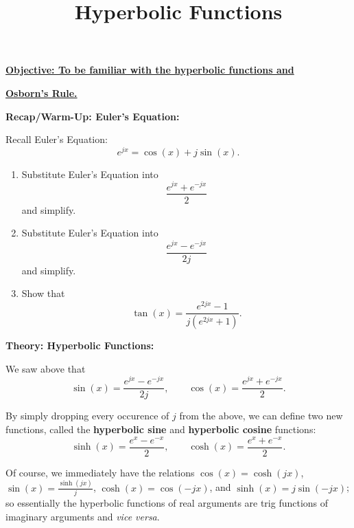 \documentclass{article}
\begin{document}
\title{Hyperbolic Functions}
\date{}

\maketitle
\thispagestyle{empty}

\Large

\textbf{\underline{Objective: To be familiar with the hyperbolic functions and}}

\textbf{\underline{Osborn's Rule.}}




\vspace{5mm}


\textbf{Recap/Warm-Up: Euler's Equation:}


\vspace{5mm}

Recall Euler's Equation:
\[e^{jx}=\cos(x)+j\sin(x).\]

\begin{enumerate}
	\item Substitute Euler's Equation into
		\[\frac{e^{jx}+e^{-jx}}{2}\]
		and simplify.
	\item Substitute Euler's Equation into
		\[\frac{e^{jx}-e^{-jx}}{2j}\]
		and simplify.
	\item Show that
		\[\tan(x)=\frac{e^{2jx}-1}{j(e^{2jx}+1)}.\]
\end{enumerate}







\clearpage



\textbf{Theory: Hyperbolic Functions:}

\vspace{5mm}

We saw above that
\[\sin(x)=\frac{e^{jx}-e^{-jx}}{2j},\qquad \cos(x)=\frac{e^{jx}+e^{-jx}}{2}.\]

By simply dropping every occurence of $j$ from the above, we can define two new functions, called the \textbf{hyperbolic sine} and \textbf{hyperbolic cosine} functions:
\[\sinh(x)=\frac{e^x-e^{-x}}{2},\qquad \cosh(x)=\frac{e^x+e^{-x}}{2}.\]

Of course, we immediately have the relations $\cos(x)=\cosh(jx)$, $\sin(x)=\frac{\sinh(jx)}{j}$, $\cosh(x)=\cos(-jx)$, and $\sinh(x)=j\sin(-jx)$; so essentially the hyperbolic functions of real arguments are trig functions of imaginary arguments and \textit{vice versa}.\bigskip
\end{document}
